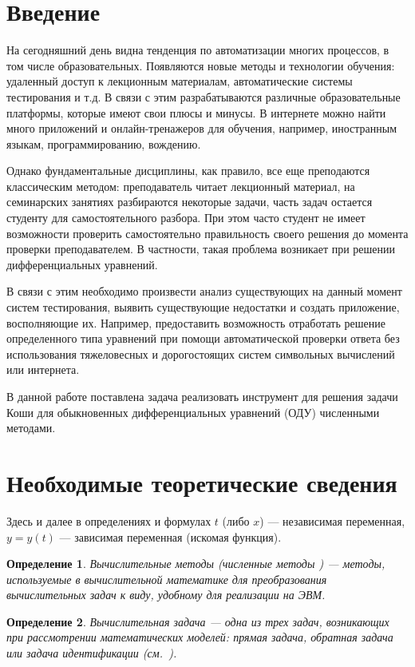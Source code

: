 \documentclass[14pt,russian]{extarticle}
\newcounter{cDefinition}
\newtheorem{Definition}{Определение}[cDefinition]
\newcommand{\anonsection}[1]{\cleardoublepage
\phantomsection
\addcontentsline{toc}{section}{\protect\numberline{}#1}
\section*{#1}}
\begin{document}
\newpage
\setcounter{page}{2}
\renewcommand\contentsname{Оглавление}
\tableofcontents
\newpage
\anonsection{Введение}    
	На сегодняшний день видна тенденция по автоматизации многих процессов, в том числе образовательных. Появляются новые методы и технологии обучения: удаленный доступ к лекционным материалам, автоматические системы тестирования и т.д. В связи с этим разрабатываются различные образовательные платформы, которые имеют свои плюсы и минусы. В интернете можно найти много приложений и онлайн-тренажеров для обучения, например, иностранным языкам, программированию, вождению.
	
	Однако фундаментальные дисциплины, как правило, все еще преподаются классическим методом: преподаватель читает лекционный материал, на семинарских занятиях разбираются некоторые задачи, часть задач остается студенту для самостоятельного разбора. При этом часто студент не имеет возможности проверить самостоятельно правильность своего решения до момента проверки преподавателем. В частности, такая проблема возникает при решении дифференциальных уравнений.
    
    В связи с этим необходимо произвести анализ существующих на данный момент систем тестирования, выявить существующие недостатки и создать приложение, восполняющие их. Например, предоставить возможность отработать решение определенного типа уравнений при помощи автоматической проверки ответа без использования тяжеловесных и дорогостоящих систем символьных вычислений или интернета.
    
    В данной работе поставлена задача реализовать инструмент для решения задачи Коши для обыкновенных дифференциальных уравнений (ОДУ) численными методами.
    
\section{Необходимые теоретические сведения}

Здесь и далее в определениях и формулах $t$ (либо $x$) --- независимая переменная, $y=y(t)$ --- зависимая переменная (искомая функция).

\begin{Definition}
\textit{Вычислительные методы} (\textit{численные методы} ) --- методы, используемые в вычислительной математике для преобразования вычислительных задач к виду, удобному для реализации на ЭВМ.~\cite[c.~55]{cite:Amosov}
\end{Definition}

\begin{Definition}
\textit{Вычислительная задача} --- одна из трех задач, возникающих при рассмотрении математических моделей:  прямая задача, обратная задача или задача идентификации \mbox{(см.~\cite[c.~43]{cite:Amosov}).}
\end{Definition}
\end{document}
